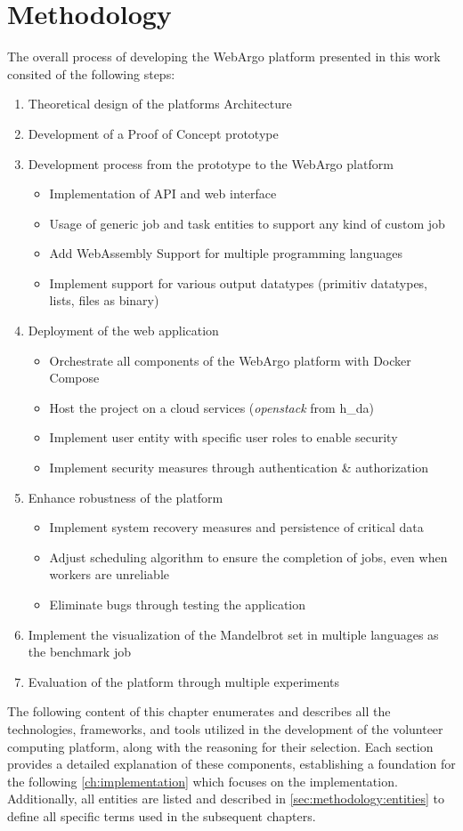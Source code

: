 \chapter{Methodology}
\label{ch:methodology}
The overall process of developing the WebArgo platform presented in this work consited of the following steps:
\begin{enumerate}
  \item Theoretical design of the platforms Architecture
  \item Development of a Proof of Concept prototype
  \item Development process from the prototype to the WebArgo platform
  \begin{itemize}
    \item Implementation of \acs{API} and web interface
    \item Usage of generic job and task entities to support any kind of custom job
    \item Add WebAssembly Support for multiple programming languages
    \item Implement support for various output datatypes (primitiv datatypes, lists, files as binary)
  \end{itemize}
  \item Deployment of the web application
  \begin{itemize}
    \item Orchestrate all components of the WebArgo platform with Docker Compose \cite{conclusion:docker}
    \item Host the project on a cloud services (\emph{openstack} from h\_da)
    \item Implement user entity with specific user roles to enable security
    \item Implement security measures through authentication \& authorization
  \end{itemize}
  \item Enhance robustness of the platform
  \begin{itemize}
    \item Implement system recovery measures and persistence of critical data
    \item Adjust scheduling algorithm to ensure the completion of jobs, even when workers are unreliable
    \item Eliminate bugs through testing the application
  \end{itemize}
  \item Implement the visualization of the Mandelbrot set in multiple languages as the benchmark job
  \item Evaluation of the platform through multiple experiments 
\end{enumerate}
The following content of this chapter enumerates and describes all the technologies, frameworks, and tools utilized in the development of the volunteer computing platform, along with the reasoning for their selection. Each section provides a detailed explanation of these components, establishing a foundation for the following \autoref{ch:implementation} which focuses on the implementation. Additionally, all entities are listed and described in \autoref{sec:methodology:entities} to define all specific terms used in the subsequent chapters.

